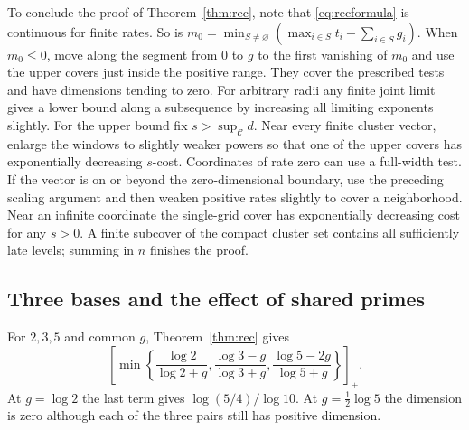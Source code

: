 \documentclass[11pt,a4paper,reqno]{amsart}
\theoremstyle{definition}
\theoremstyle{remark}
\numberwithin{equation}{section}
\begin{document}
To conclude the proof of Theorem~\ref{thm:rec}, note that \eqref{eq:recformula} is continuous for finite rates. So is
\(m_0=\min_{S\ne\varnothing}(\max_{i\in S}t_i-\sum_{i\in S}g_i)\).
When \(m_0\le0\), move along the segment from \(0\) to \(g\) to the first vanishing of \(m_0\) and use the upper covers just inside the positive range. They cover the prescribed tests and have dimensions tending to zero. For arbitrary radii any finite joint limit gives a lower bound along a subsequence by increasing all limiting exponents slightly. For the upper bound fix \(s>\sup_{\mathcal C}d\). Near every finite cluster vector, enlarge the windows to slightly weaker powers so that one of the upper covers has exponentially decreasing \(s\)-cost. Coordinates of rate zero can use a full-width test. If the vector is on or beyond the zero-dimensional boundary, use the preceding scaling argument and then weaken positive rates slightly to cover a neighborhood. Near an infinite coordinate the single-grid cover has exponentially decreasing cost for any \(s>0\). A finite subcover of the compact cluster set contains all sufficiently late levels; summing in \(n\) finishes the proof.

\subsection{Three bases and the effect of shared primes}
For \(2,3,5\) and common \(g\), Theorem~\ref{thm:rec} gives
\[
 \left[\min\left\{\frac{\log 2}{\log 2+g},
                  \frac{\log 3-g}{\log 3+g},
                  \frac{\log 5-2g}{\log 5+g}\right\}\right]_+ .
\]
At \(g=\log 2\) the last term gives \(\log(5/4)/\log 10\). At \(g=\tfrac12\log 5\) the dimension is zero although each of the three pairs still has positive dimension.
\end{document}
